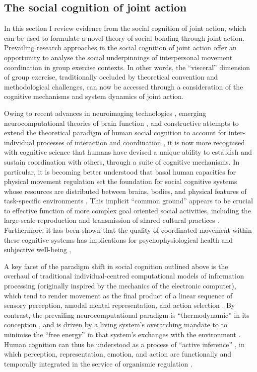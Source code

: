 \begin{CJK}{UTF8}{gbsn}
\section{The social cognition of joint action}

In this section I review evidence from the social cognition of joint action, which can be used to formulate a novel theory of social bonding through joint action.  Prevailing research approaches in the social cognition of joint action offer an opportunity to analyse the social underpinnings of interpersonal movement coordination in group exercise contexts.   In other words, the ``visceral'' dimension of group exercise, traditionally occluded by theoretical convention and methodological challenges, can now be accessed through a consideration of the cognitive mechanisms and system dynamics of joint action.

Owing to recent advances in neuroimaging technologies \citep{Frith2007}, emerging neurocomputational theories of brain function \citep{Yufik2013,Friston2010,Frith2010,Clark2013}, and constructive attempts to extend the theoretical paradigm of human social cognition to account for inter-individual processes of interaction and coordination \citep{Sebanz2006,Dale2014}, it is now more recognised with cognitive science that humans have devised a unique ability to establish and sustain coordination with others, through a suite of cognitive mechanisms.  In particular, it is becoming better understood that basal human capacities for physical movement regulation set the foundation for social cognitive systems whose resources are distributed between brains, bodies, and physical features of task-specific environments \citep{Hutchins2000,Kirsh2006,Semin2008,Semin2012,Coey2012}.  This implicit ``common ground'' appears to be crucial to effective function of more complex goal oriented social activities, including the large-scale reproduction and transmission of shared cultural practices \citep{Dunbar2012,Roepstorff2010,Claidiere2014,Launay2016}.  Furthermore, it has been shown that the quality of coordinated movement within these cognitive systems has implications for psychophysiological health and subjective well-being \citep{Wheatley2012},

A key facet of the paradigm shift in social cognition outlined above is the overhaul of traditional individual-centred computational models of information processing (originally inspired by the mechanics of the electronic computer), which tend to render movement as the final product of a linear sequence of sensory perception, amodal mental representation, and action selection \citep{Lewis2005}.  By contrast, the prevailing neurocomputational paradigm is ``thermodynamic'' in its conception \citep{Yufik2013}, and is driven by a living system's overarching mandate to to minimise the ``free energy'' in that system's exchanges with the environment \citep{Friston2010}.  Human cognition can thus be understood as a process of ``active inference'' \citep{Clark2013}, in which perception, representation, emotion, and action are functionally and temporally integrated in the service of organismic regulation \citep{Yufik2017}.


\end{CJK}
